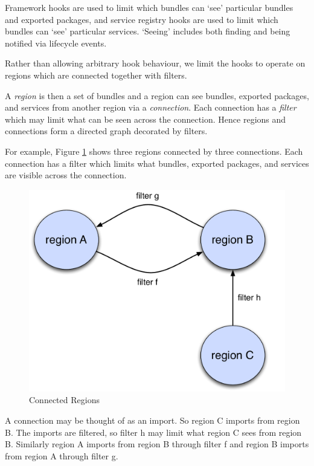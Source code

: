 \documentclass[a4paper,9pt]{article}
\begin{document}
Framework hooks are used to limit which bundles can `see' particular bundles
and exported packages, and service registry hooks are used to limit which bundles
can `see' particular services. `Seeing' includes both finding and being notified via lifecycle events.

Rather than allowing arbitrary hook behaviour, we limit the hooks to operate on regions
which are connected together with filters.

A \textit{region} is then a set of bundles and a region can see bundles, exported packages, and services
from another region via a \textit{connection}. Each connection has a \textit{filter} which may limit
what can be seen across the connection.
Hence regions and connections form a directed graph decorated by filters.

For example, Figure \ref{fig:conn} shows three regions connected by three connections.
Each connection has a filter which limits what bundles, exported packages, and services
are visible across the connection.

\begin{figure}[h!]
\begin{center}
\includegraphics*[scale=0.35]{connected-regions.pdf}
\caption{Connected Regions}
\end{center}
\label{fig:conn}
\end{figure}

A connection may be thought of as an import. So region C imports from region B.
The imports are filtered, so filter h may limit what region C sees from region B.
Similarly region A imports from region B through filter f and region B imports from region A through
filter g.
\end{document}

